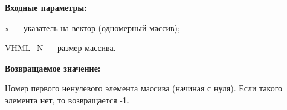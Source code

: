 \textbf{Входные параметры:}

 x --- указатель на вектор (одномерный массив);
 
 VHML\_N --- размер массива.

\textbf{Возвращаемое значение:}

Номер первого ненулевого элемента массива (начиная с нуля). Если такого элемента нет, то возвращается -1.